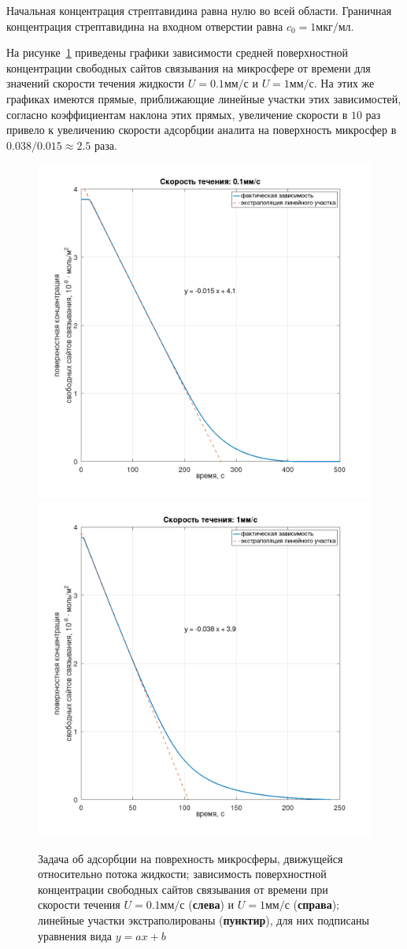 \documentclass[oneside,final,12pt]{extreport}
\begin{document}
Начальная концентрация стрептавидина равна нулю во всей области.
Граничная концентрация стрептавидина на входном отверстии равна
$c_0 = 1\text{мкг}/\text{мл}$.

На рисунке~\ref{fig:sphere_flow_probes} приведены графики зависимости
средней поверхностной концентрации свободных сайтов связывания
на микросфере от времени для значений скорости течения жидкости
$U = 0.1\text{мм}/\text{с}$ и $U = 1\text{мм}/\text{с}$.
На этих же графиках имеются прямые, приближающие линейные участки этих зависимостей,
согласно коэффициентам наклона этих прямых, увеличение скорости в $10$ раз
привело к увеличению скорости адсорбции аналита на поверхность микросфер
в $0.038/0.015 \approx 2.5$ раза.

\begin{figure}
  \centering
  \includegraphics[width=.5\textwidth]{pic/sphere_flow_dil100_probe}%
  \includegraphics[width=.5\textwidth]{pic/sphere_flow_dil100_fast_probe}

  \caption{%
    \label{fig:sphere_flow_probes}%
    Задача об адсорбции на поврехность микросферы, движущейся относительно потока жидкости;
    зависимость поверхностной концентрации свободных сайтов связывания от времени
    при скорости течения $U = 0.1\text{мм}/\text{с}$ (\textbf{слева}) и
    $U = 1\text{мм}/\text{с}$ (\textbf{справа});
    линейные участки экстраполированы (\textbf{пунктир}),
    для них подписаны уравнения вида $y = ax + b$
  }
\end{figure}
\end{document}
